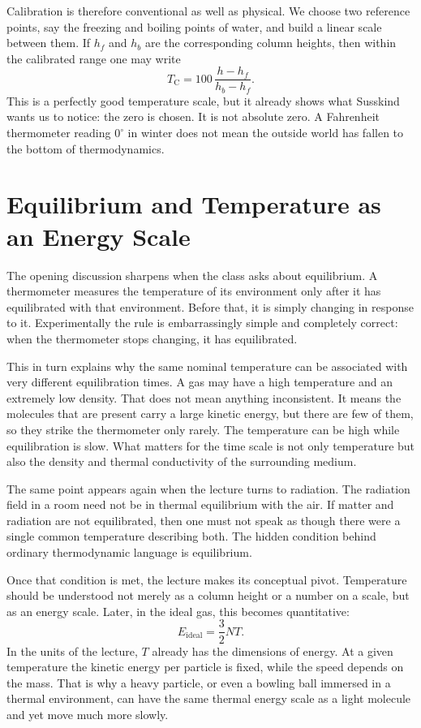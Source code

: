 Calibration is therefore conventional as well as physical. We choose two reference points, say the freezing and boiling points of water, and build a linear scale between them. If \(h_f\) and \(h_b\) are the corresponding column heights, then within the calibrated range one may write
\begin{equation}
T_{\mathrm{C}}=100\,\frac{h-h_f}{h_b-h_f}.
\end{equation}
This is a perfectly good temperature scale, but it already shows what Susskind wants us to notice: the zero is chosen. It is not absolute zero. A Fahrenheit thermometer reading \(0^\circ\) in winter does not mean the outside world has fallen to the bottom of thermodynamics.

\section{Equilibrium and Temperature as an Energy Scale}

The opening discussion sharpens when the class asks about equilibrium. A thermometer measures the temperature of its environment only after it has equilibrated with that environment. Before that, it is simply changing in response to it. Experimentally the rule is embarrassingly simple and completely correct: when the thermometer stops changing, it has equilibrated.

This in turn explains why the same nominal temperature can be associated with very different equilibration times. A gas may have a high temperature and an extremely low density. That does not mean anything inconsistent. It means the molecules that are present carry a large kinetic energy, but there are few of them, so they strike the thermometer only rarely. The temperature can be high while equilibration is slow. What matters for the time scale is not only temperature but also the density and thermal conductivity of the surrounding medium.

The same point appears again when the lecture turns to radiation. The radiation field in a room need not be in thermal equilibrium with the air. If matter and radiation are not equilibrated, then one must not speak as though there were a single common temperature describing both. The hidden condition behind ordinary thermodynamic language is equilibrium.

Once that condition is met, the lecture makes its conceptual pivot. Temperature should be understood not merely as a column height or a number on a scale, but as an energy scale. Later, in the ideal gas, this becomes quantitative:
\begin{equation}
E_{\mathrm{ideal}}=\frac{3}{2}NT.
\end{equation}
In the units of the lecture, \(T\) already has the dimensions of energy. At a given temperature the kinetic energy per particle is fixed, while the speed depends on the mass. That is why a heavy particle, or even a bowling ball immersed in a thermal environment, can have the same thermal energy scale as a light molecule and yet move much more slowly.

